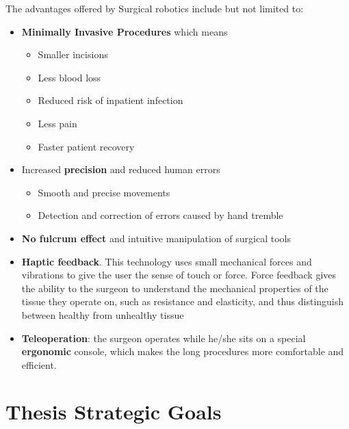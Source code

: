 %
%
The advantages offered by Surgical robotics include but not limited to:
\begin{itemize}
\item \textbf{Minimally Invasive Procedures} which means
	\begin{itemize}
	\item Smaller incisions
	\item Less blood loss
	\item Reduced risk of inpatient infection
	\item Less pain
	\item Faster patient recovery
	\end{itemize}
\item Increased \textbf{precision} and reduced human errors
	\begin{itemize}
	\item Smooth and precise movements
	\item Detection and correction of errors caused by hand tremble
	\end{itemize}
\item \textbf{No fulcrum effect} and intuitive manipulation of surgical tools
\item \textbf{Haptic feedback}. This technology uses small mechanical forces and vibrations to give the user the sense of touch or force. Force feedback gives the ability to the surgeon to understand the mechanical properties of the tissue they operate on, such as resistance and elasticity, and thus distinguish between healthy from unhealthy tissue
\item \textbf{Teleoperation}: the surgeon operates while he/she sits on a special \textbf{ergonomic} console, which makes the long procedures more comfortable and efficient.
\end{itemize} 

\section{Thesis Strategic Goals}

